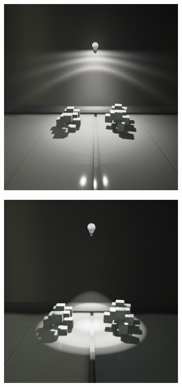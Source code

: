 \begin{figure}
\begin{fullwidth}
	\begin{subfigure}[b]{0.209\thewidth}
		\includegraphics[width=1.\textwidth]{figures/intro/IES_01}
	\end{subfigure}
	\begin{subfigure}[b]{0.213\thewidth}
		\includegraphics[width=1.\textwidth]{figures/intro/IES_02}

\end{subfigure}
\end{fullwidth}
\end{figure}
